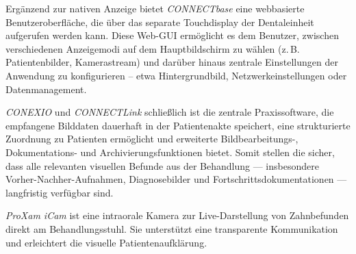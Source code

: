 Ergänzend zur nativen Anzeige bietet \textit{CONNECTbase} eine webbasierte Benutzeroberfläche, die über das separate Touchdisplay der Dentaleinheit aufgerufen werden kann. Diese Web-GUI ermöglicht es dem Benutzer, zwischen verschiedenen Anzeigemodi auf dem Hauptbildschirm zu wählen (z.\,B. Patientenbilder, Kamerastream) und darüber hinaus zentrale Einstellungen der Anwendung zu konfigurieren – etwa Hintergrundbild, Netzwerkeinstellungen oder Datenmanagement.


\textit{CONEXIO} und \textit{CONNECTLink} schließlich ist die zentrale Praxissoftware, die empfangene Bilddaten dauerhaft in der Patientenakte speichert, eine strukturierte Zuordnung zu Patienten ermöglicht und erweiterte Bildbearbeitungs-, Dokumentations- und Archivierungsfunktionen bietet. Somit stellen die sicher, dass alle relevanten visuellen Befunde aus der Behandlung — insbesondere Vorher-Nachher-Aufnahmen, Diagnosebilder und Fortschrittsdokumentationen — langfristig verfügbar sind.

\textit{ProXam iCam} ist eine intraorale Kamera zur Live-Darstellung von Zahnbefunden direkt am Behandlungsstuhl. Sie unterstützt eine transparente Kommunikation und erleichtert die visuelle Patientenaufklärung.

